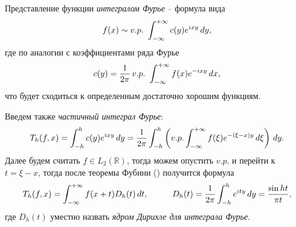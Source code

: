 


Представление функции \textit{интегралом Фурье} -- формула вида
\begin{equation*}
    f(x) \sim v.p.\ \int_{-\infty}^{+\infty}  c(y) e^{ixy} \, d y,
\end{equation*}
где по аналогии с коэффициентами ряда Фурье
\begin{equation*}
    c(y) = \frac{1}{2\pi} \, v.p. \ \int_{-\infty}^{+\infty} f(x) e^{-ixy} \d x,
\end{equation*}
что будет сходиться  к определенным достаточно хорошим функциям.    


Введем также \textit{частичный интеграл Фурье}:
\begin{equation*}
    T_h (f, x) = \int_{-h}^{h} c(y) e^{ixy} \, d y = \frac{1}{2\pi} \int_{-h}^{h} \left(
        v.p. \int_{-\infty}^{+\infty} f(\xi) e^{-(\xi-x)y} \, d \xi
    \right) \, d y.
\end{equation*}
Далее будем считать $f \in L_2 (\mathbb{R})$, тогда можем опустить $v.p.$ и перейти к $t =  \xi - x$, тогда после теоремы Фубини () получится формула
\begin{equation*}
    T_h (f, x) = \int_{-\infty}^{+\infty} f(x+t) D_h (t) \d t,
    \hspace{10 mm} 
    D_h(t) = \frac{1}{2\pi} \int_{-h}^{h}  e^{ity} \d y = \frac{\sin ht}{\pi t},
\end{equation*}
где $D_h (t)$ уместно назвать \textit{ядром Дирихле для интеграла Фурье}. 



